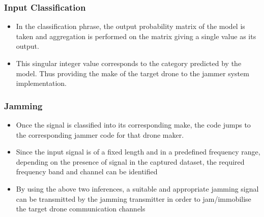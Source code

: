   \subsubsection*{Input Classification}
    \begin{itemize}
      \item In the classification phrase, the output probability matrix of the model is taken and aggregation is performed on the matrix giving a single value as its output.
      \item This singular integer value corresponds to the category predicted by the model. Thus providing the make of the target drone to the jammer system implementation.
    \end{itemize}

  \subsubsection*{Jamming}
    \begin{itemize}
      \item Once the signal is classified into its corresponding make, the code jumps to the corresponding jammer code for that drone maker.
      \item Since the input signal is of a fixed length and in a predefined frequency range, depending on the presence of signal in the captured dataset, the required frequency band and channel can be identified
      \item By using the above two inferences, a suitable and appropriate jamming signal can be transmitted by the jamming transmitter in order to jam/immobilise the target drone communication channels
    \end{itemize}

